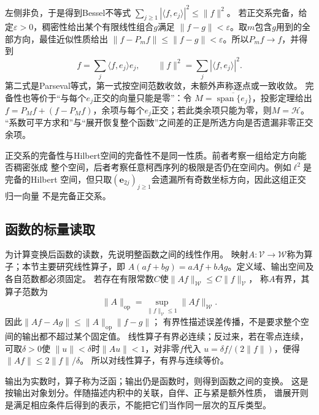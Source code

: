左侧非负，于是得到Bessel不等式
$\sum_{j\geq1}|\langle f,e_j\rangle|^2\leq\lVert f\rVert^2$。
若正交系完备，给定$\varepsilon>0$，稠密性给出某个有限线性组合$g$满足
$\lVert f-g\rVert<\varepsilon$。取$m$包含$g$用到的全部方向，最佳近似性质给出
$\lVert f-P_mf\rVert\leq\lVert f-g\rVert<\varepsilon$。所以$P_mf\to f$，并得到
\[
 f=\sum_j\langle f,e_j\rangle e_j,\qquad
 \lVert f\rVert^2=\sum_j|\langle f,e_j\rangle|^2.
\]
第二式是Parseval等式，第一式按空间范数收敛，未额外声称逐点或一致收敛。
完备性也等价于“与每个$e_j$正交的向量只能是零”：令
$M=\overline{\operatorname{span}\{e_j\}}$，投影定理给出
$f=P_Mf+(f-P_Mf)$，余项与每个$e_j$正交；若此类余项只能为零，则$M=\mathcal H$。
“系数可平方求和”与“展开恢复整个函数”之间差的正是所选方向是否遗漏非零正交余项。

正交系的完备性与Hilbert空间的完备性不是同一性质。前者考察一组给定方向能否稠密张成
整个空间，后者考察任意柯西序列的极限是否仍在空间内。例如$\ell^2$是完备的Hilbert
空间，但只取$(\bm{e}_{2j})_{j\geq1}$会遗漏所有奇数坐标方向，因此这组正交归一向量
不是完备正交系。

\subsection{函数的标量读取}
\label{sec:functional-scalar-readouts}
\label{sec:functional-positive-kernels-rkhs}


为计算变换后函数的读数，先说明整函数之间的线性作用。
映射$A:\mathcal V\to\mathcal W$称为算子；本节主要研究线性算子，即
$A(af+bg)=aAf+bAg$。定义域、输出空间及各自范数都必须固定。
若存在有限常数$C$使$\lVert Af\rVert_{\mathcal W}\leq C\lVert f\rVert_{\mathcal V}$，
称$A$有界，其算子范数为
\[
 \lVert A\rVert_{\mathrm{op}}
 =\sup_{\lVert f\rVert_{\mathcal V}\leq1}\lVert Af\rVert_{\mathcal W}.
\]
因此$\lVert Af-Ag\rVert\leq\lVert A\rVert_{\mathrm{op}}\lVert f-g\rVert$；
有界性描述误差传播，不是要求整个空间的输出都不超过某个固定值。
线性算子有界必连续；反过来，若在零点连续，可取$\delta>0$使
$\lVert u\rVert<\delta$时$\lVert Au\rVert<1$，对非零$f$代入
$u=\delta f/(2\lVert f\rVert)$，便得$\lVert Af\rVert\leq2\lVert f\rVert/\delta$。
所以对线性算子，有界与连续等价。

输出为实数时，算子称为泛函；输出仍是函数时，则得到函数之间的变换。
这是按输出对象划分。伴随描述内积中的关联，自伴、正与紧是额外性质，
谱展开则是满足相应条件后得到的表示，不能把它们当作同一层次的互斥类型。

